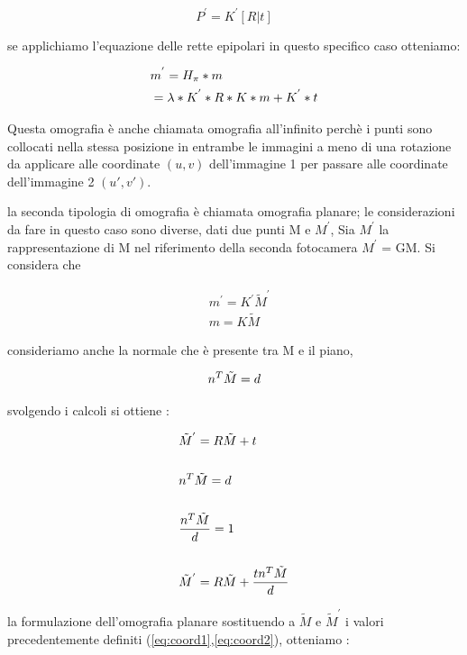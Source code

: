 \documentclass[11pt, oneside]{article}   	%
\begin{document}
\begin{displaymath} 
	P^{'} = K^{'}[R|t]
\end{displaymath}

se applichiamo l'equazione delle rette epipolari in questo specifico caso otteniamo:


\begin{eqnarray}
	&m^{'} = H_{\pi} * m  \notag \\
	&= \lambda * K^{'} * R * K * m + K^{'}*t \notag
\end{eqnarray}

Questa omografia è anche chiamata omografia all'infinito perchè i punti sono collocati nella stessa posizione in entrambe le immagini a meno di una rotazione da applicare alle coordinate $(u,v)$ dell'immagine 1  per passare  alle coordinate dell'immagine 2 $(u',v')$.

la seconda tipologia di omografia  è chiamata omografia planare;
le considerazioni da fare in questo caso sono diverse,
dati due punti M e $M^{'}$,
Sia $M^{'}$ la rappresentazione di M nel riferimento della seconda  fotocamera $M^{'}$ = GM.
Si considera che 


\begin{eqnarray}
	&m^{'} = K^{'}\tilde{M}^{'} \label{eq:coord1} \\
	&m = K\tilde{M}
	\label{eq:coord2}
\end{eqnarray}

consideriamo anche la normale che è presente tra M e il piano,

\begin{align}
	n^{T}\tilde{M} = d \notag
\end{align}

svolgendo i calcoli si ottiene  :

\begin{eqnarray}
	& \tilde{M}^{'} = R\tilde{M} + t \notag \\
	\notag \\
	& n^{T}\tilde{M} = d \notag \\
	\notag \\
	& \frac{n^{T}\tilde{M}}{d} = 1 \notag \\
	\notag \\
	& \tilde{M}^{'} = R\tilde{M} + \frac{tn^{T}\tilde{M}}{d} \notag
\end{eqnarray}

la formulazione dell'omografia planare sostituendo a $\tilde{M}$ e $\tilde{M}^{'}$  i valori precedentemente definiti (\ref{eq:coord1},\ref{eq:coord2}),
otteniamo :
\end{document}
